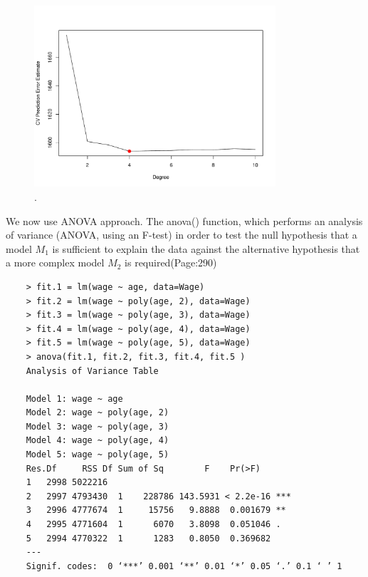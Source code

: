 \documentclass{article}
\begin{document}
\begin{figure}[htb]
	\begin{center}
		\includegraphics[width=0.8\textwidth]{MTH522_hw6_p1a_2.pdf}
	\end{center}
	\caption{.}
	\label{fig:MTH522_hw6_p1a_2}
\end{figure}

We now use ANOVA approach. The anova() function, which performs an analysis of variance (ANOVA, using an F-test) in order to test the null hypothesis that a model $M_1$ is sufficient to explain the data against the alternative hypothesis that a more complex model $M_2$ is required(Page:290)

\newpage


\begin{program}
	\begin{verbatim}
	> fit.1 = lm(wage ~ age, data=Wage)
	> fit.2 = lm(wage ~ poly(age, 2), data=Wage)
	> fit.3 = lm(wage ~ poly(age, 3), data=Wage)
	> fit.4 = lm(wage ~ poly(age, 4), data=Wage)
	> fit.5 = lm(wage ~ poly(age, 5), data=Wage)
	> anova(fit.1, fit.2, fit.3, fit.4, fit.5 )
	Analysis of Variance Table
	
	Model 1: wage ~ age
	Model 2: wage ~ poly(age, 2)
	Model 3: wage ~ poly(age, 3)
	Model 4: wage ~ poly(age, 4)
	Model 5: wage ~ poly(age, 5)
	Res.Df     RSS Df Sum of Sq        F    Pr(>F)    
	1   2998 5022216                                    
	2   2997 4793430  1    228786 143.5931 < 2.2e-16 ***
	3   2996 4777674  1     15756   9.8888  0.001679 ** 
	4   2995 4771604  1      6070   3.8098  0.051046 .  
	5   2994 4770322  1      1283   0.8050  0.369682    
	---
	Signif. codes:  0 ‘***’ 0.001 ‘**’ 0.01 ‘*’ 0.05 ‘.’ 0.1 ‘ ’ 1
	\end{verbatim}
\end{program}
\end{document}

